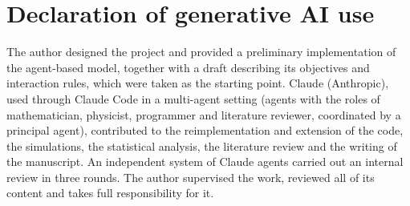 \documentclass[11pt]{article}
\begin{document}
\section*{Declaration of generative AI use}
The author designed the project and provided a preliminary implementation of the agent-based model, together with a
draft describing its objectives and interaction rules, which were taken as the starting point. Claude (Anthropic),
used through Claude Code in a multi-agent setting (agents with the roles of mathematician, physicist, programmer and
literature reviewer, coordinated by a principal agent), contributed to the reimplementation and extension of the
code, the simulations, the statistical analysis, the literature review and the writing of the manuscript. An
independent system of Claude agents carried out an internal review in three rounds. The author supervised the work,
reviewed all of its content and takes full responsibility for it.




\appendix





\end{document}
